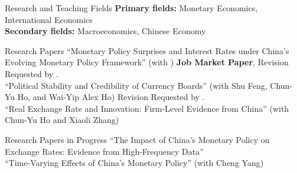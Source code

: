 \documentclass{resume_liang} %
\begin{document}
\begin{rSection}{Research and Teaching Fields}
{\bf Primary fields:} Monetary Economics, International Economics 
\vspace{0.1cm} \\ 
{\bf Secondary fields:} Macroeconomics, Chinese Economy 
\\ 
\end{rSection}
\bigskip  




\begin{rSection}{Research Papers}
``Monetary Policy Surprises and Interest Rates under China's Evolving Monetary Policy Framework'' (with \href{https://sites.google.com/site/chunyuho}{\color{black}{Chun-Yu Ho}}) \textbf{Job Market Paper}, Revision Requested by \textit{}.
\vspace{0.1cm} \\
``Political Stability and Credibility of Currency Boards'' (with Shu Feng, Chun-Yu Ho, and Wai-Yip Alex Ho) Revision Requested by \textit{}.
\vspace{0.1cm} \\
``Real Exchange Rate and Innovation: Firm-Level Evidence from China'' (with Chun-Yu Ho and Xiaoli Zhang) 
\\
\end{rSection}
\bigskip  




\begin{rSection}{Research Papers in Progress}
``The Impact of China's Monetary Policy on Exchange Rates: Evidence from High-Frequency Data''
\vspace{0.1cm}\\
``Time-Varying Effects of China's Monetary Policy'' (with Cheng Yang)
\\
\end{rSection}
\bigskip  
\end{document}
